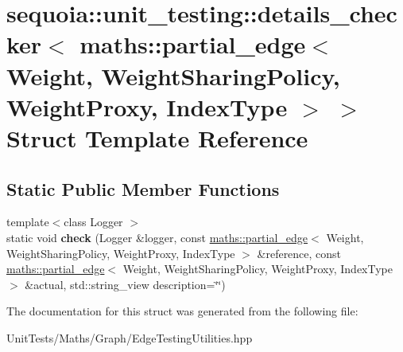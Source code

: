 \hypertarget{structsequoia_1_1unit__testing_1_1details__checker_3_01maths_1_1partial__edge_3_01_weight_00_01_71a88c777058c31d9900c71c4aa4571c}{}\section{sequoia\+::unit\+\_\+testing\+::details\+\_\+checker$<$ maths\+::partial\+\_\+edge$<$ Weight, Weight\+Sharing\+Policy, Weight\+Proxy, Index\+Type $>$ $>$ Struct Template Reference}
\label{structsequoia_1_1unit__testing_1_1details__checker_3_01maths_1_1partial__edge_3_01_weight_00_01_71a88c777058c31d9900c71c4aa4571c}
\subsection*{Static Public Member Functions}
\begin{DoxyCompactItemize}
\item 
\mbox{\label{structsequoia_1_1unit__testing_1_1details__checker_3_01maths_1_1partial__edge_3_01_weight_00_01_71a88c777058c31d9900c71c4aa4571c_a8654dca59dbeddc3854e6c78048e94f5}} 
{\footnotesize template$<$class Logger $>$ }\\static void {\bfseries check} (Logger \&logger, const \mbox{\hyperlink{classsequoia_1_1maths_1_1partial__edge}{maths\+::partial\+\_\+edge}}$<$ Weight, Weight\+Sharing\+Policy, Weight\+Proxy, Index\+Type $>$ \&reference, const \mbox{\hyperlink{classsequoia_1_1maths_1_1partial__edge}{maths\+::partial\+\_\+edge}}$<$ Weight, Weight\+Sharing\+Policy, Weight\+Proxy, Index\+Type $>$ \&actual, std\+::string\+\_\+view description=\char`\"{}\char`\"{})
\end{DoxyCompactItemize}


The documentation for this struct was generated from the following file\+:\begin{DoxyCompactItemize}
\item 
Unit\+Tests/\+Maths/\+Graph/Edge\+Testing\+Utilities.\+hpp\end{DoxyCompactItemize}
